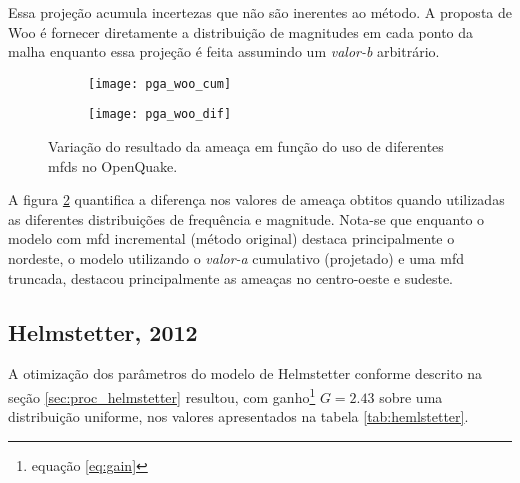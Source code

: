 Essa projeção acumula incertezas que não são inerentes ao método. A proposta de Woo é fornecer
diretamente a distribuição de magnitudes em cada ponto da malha enquanto essa projeção é feita
assumindo um \emph{valor-b} arbitrário.


\begin{figure}[H]
	\centering
	\begin{subfigure}[t]{0.47\textwidth}
		\centering
		\texttt{[image: pga\_woo\_cum]} 
		\label{fig:pga_woo_cum} 
	\end{subfigure}
	\quad
	\begin{subfigure}[t]{0.47\textwidth}
		\centering
		\texttt{[image: pga\_woo\_dif]} 
		\label{fig:pga_woo_dif} 
	\end{subfigure}
	\caption{Variação do resultado da ameaça em função do uso de diferentes 
			\glspl{mfd} no OpenQuake.}
	\label{fig:pga_woo} 
\end{figure}

A figura \ref{fig:pga_woo_dif} quantifica a diferença nos valores de ameaça obtitos quando 
utilizadas as diferentes distribuições de frequência e magnitude. Nota-se que enquanto
o modelo com \gls{mfd} incremental (método original) destaca principalmente o nordeste, o modelo utilizando o
\emph{valor-a} cumulativo (projetado) e uma \gls{mfd} truncada, destacou principalmente as ameaças no centro-oeste e
sudeste.


\subsection{Helmstetter, 2012}
\label{sec:helmstetter_resultados}

A otimização dos parâmetros do modelo de Helmstetter conforme descrito na seção \ref{sec:proc_helmstetter}
resultou, com ganho\footnote{equação \eqref{eq:gain}} $G = 2.43$ sobre uma distribuição uniforme, nos valores
apresentados na tabela \ref{tab:hemlstetter}.

